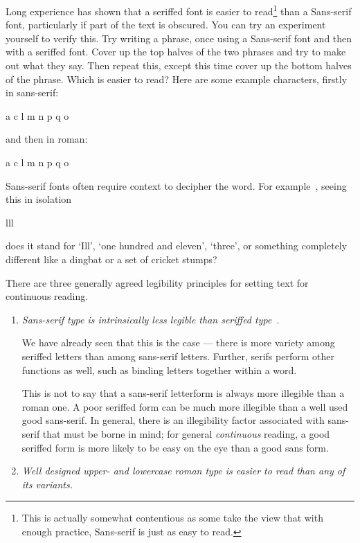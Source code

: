 \documentclass[10pt,a4paper,oneside,extrafontsizes]{memoir}%
\begin{document}
\begin{paracol}{2}
Long experience has shown that a seriffed font is easier to 
read\footnote{This is actually somewhat contentious as some take the view
that with enough practice, Sans-serif is just as easy to read.}
than a
Sans-serif font, particularly if part of the text is obscured. You can
try an experiment yourself to verify this. Try writing a phrase, once
using a Sans-serif font and then with a seriffed font. Cover up
the top halves of the two phrases and try to make out what they say. Then
repeat this, except this time cover up the bottom halves of the phrase.
Which is easier to read? Here are some example characters, firstly in sans-serif:
\begin{center}
{\Huge\sffamily a c l m n p q o}
\end{center}
and then in roman:
\begin{center}
{\Huge a c l m n p q o}
\end{center}

    Sans-serif fonts often require context to decipher the word. 
For example~\autocite{MCLEAN80},
seeing this in isolation
\begin{center}
{\Huge\sffamily lll}
\end{center}
does it stand for `Ill', `one hundred and eleven', `three', or something
completely different like a dingbat or a set of cricket stumps?

    
    There are three generally agreed legibility 
principles for setting text for
continuous reading.

\begin{enumerate}
\item \emph{Sans-serif type is intrinsically less legible than seriffed type}~\autocite{WHEILDON95}.

    We have already seen that this is the case --- there is more variety
among seriffed letters than among sans-serif letters. Further, serifs
perform other functions as well, such as binding letters together within
a word.

    This is not to say that a sans-serif letterform is always more illegible
than a roman one. A poor seriffed form can be much more illegible than
a well used good sans-serif. In general, there is an illegibility factor
associated with sans-serif that must be borne in mind; for general
\emph{continuous} reading, a good seriffed form is more likely to be
easy on the eye than a good sans form.

\item \emph{Well designed upper- and lowercase roman type is easier to read than
any of its variants.}


\end{enumerate}
\end{paracol}
\end{document}
